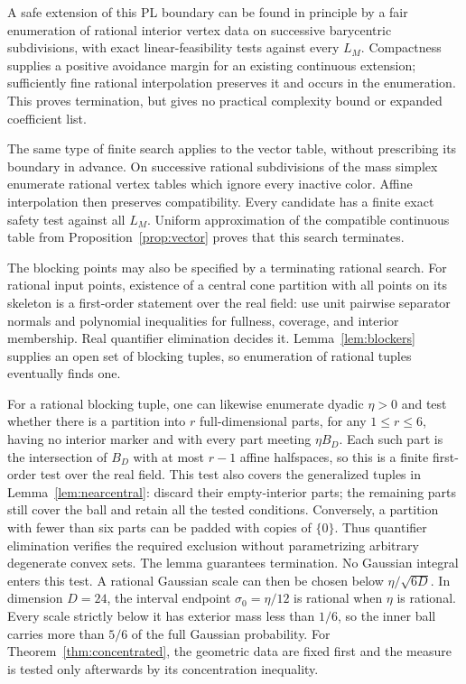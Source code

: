 \documentclass[a4paper,11pt,reqno]{amsart}
\theoremstyle{definition}
\theoremstyle{remark}
\numberwithin{equation}{section}
\begin{document}
A safe extension of this PL boundary can be found in principle by
a fair enumeration of rational interior vertex data on successive
barycentric subdivisions, with exact linear-feasibility tests against
every $L_M$. Compactness supplies a positive avoidance margin for
an existing continuous extension; sufficiently fine rational
interpolation preserves it and occurs in the enumeration. This
proves termination, but gives no practical complexity bound or
expanded coefficient list.

The same type of finite search applies to the vector table, without
prescribing its boundary in advance. On successive rational
subdivisions of the mass simplex enumerate rational vertex tables
which ignore every inactive color. Affine interpolation then preserves
compatibility. Every candidate has a finite exact safety test against
all $L_M$. Uniform approximation of the compatible continuous table
from Proposition~\ref{prop:vector} proves that this search terminates.

The blocking points may also be specified by a terminating rational
search. For rational input points, existence of a central cone
partition with all points on its skeleton is a first-order statement
over the real field: use unit pairwise separator normals and
polynomial inequalities for fullness, coverage, and interior
membership. Real quantifier elimination decides it. Lemma~\ref{lem:blockers}
supplies an open set of blocking tuples, so enumeration of rational
tuples eventually finds one.

For a rational blocking tuple, one can likewise enumerate dyadic
$\eta>0$ and test whether there is a partition into $r$ full-dimensional
parts, for any $1\le r\le6$, having no interior marker and with every
part meeting $\eta B_D$. Each such part is the intersection of $B_D$
with at most $r-1$ affine halfspaces, so this is a finite first-order
test over the real field. This test also covers the generalized tuples
in Lemma~\ref{lem:nearcentral}: discard their empty-interior parts;
the remaining parts still cover the ball and retain all the tested
conditions. Conversely, a partition with fewer than six parts can be
padded with copies of $\{0\}$. Thus quantifier elimination verifies
the required exclusion without parametrizing arbitrary degenerate
convex sets. The lemma guarantees termination. No Gaussian integral
enters this test.
A rational Gaussian scale can then be chosen below
$\eta/\sqrt{6D}$. In dimension $D=24$, the interval endpoint
$\sigma_0=\eta/12$ is rational when $\eta$ is rational. Every scale
strictly below it has exterior mass less than $1/6$, so the inner
ball carries more than $5/6$ of the full Gaussian probability.
For Theorem~\ref{thm:concentrated}, the geometric data are fixed first and the
measure is tested only afterwards by its concentration inequality.
\end{document}
